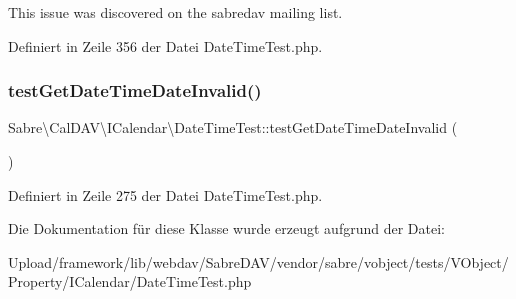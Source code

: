 This issue was discovered on the sabredav mailing list. 

Definiert in Zeile 356 der Datei Date\+Time\+Test.\+php.

\mbox{\label{class_sabre_1_1_v_object_1_1_property_1_1_i_calendar_1_1_date_time_test_aee897215bbb8e0cf42a22a00e510c514}} 
\subsubsection{\texorpdfstring{test\+Get\+Date\+Time\+Date\+Invalid()}{testGetDateTimeDateInvalid()}}
{\footnotesize\ttfamily Sabre\textbackslash{}\+Cal\+D\+A\+V\textbackslash{}\+I\+Calendar\textbackslash{}\+Date\+Time\+Test\+::test\+Get\+Date\+Time\+Date\+Invalid (\begin{DoxyParamCaption}{ }\end{DoxyParamCaption})}



Definiert in Zeile 275 der Datei Date\+Time\+Test.\+php.



Die Dokumentation für diese Klasse wurde erzeugt aufgrund der Datei\+:\begin{DoxyCompactItemize}
\item 
Upload/framework/lib/webdav/\+Sabre\+D\+A\+V/vendor/sabre/vobject/tests/\+V\+Object/\+Property/\+I\+Calendar/Date\+Time\+Test.\+php\end{DoxyCompactItemize}
